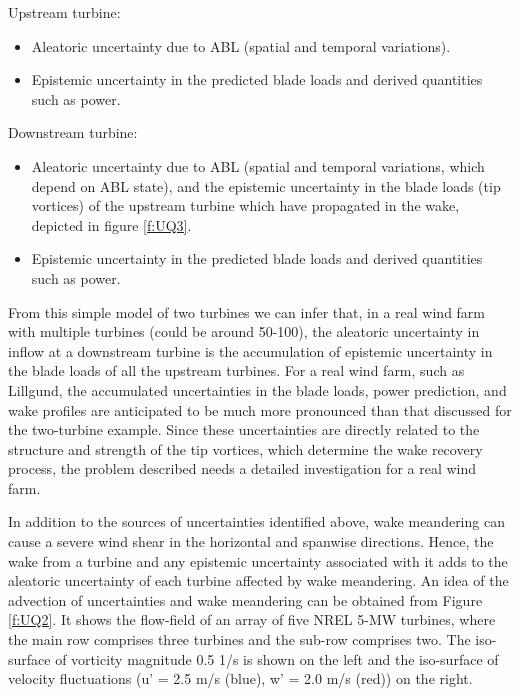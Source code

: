 \documentclass[]{aiaa-tc}%
\begin{document}
Upstream turbine: 
\begin{itemize}
  \item Aleatoric uncertainty due to ABL (spatial and temporal variations).
  \item Epistemic uncertainty in the predicted blade loads and derived quantities such as power.
\end{itemize}

Downstream turbine: 
\begin{itemize}
  \item Aleatoric uncertainty due to ABL (spatial and temporal variations, which depend on ABL state), and the epistemic uncertainty in the blade loads (tip vortices) of the upstream turbine which have propagated in the wake, depicted in figure \ref{f:UQ3}.
  \item Epistemic uncertainty in the predicted blade loads and derived quantities such as power.
\end{itemize}

From this simple model of two turbines we can infer that, in a real wind farm with multiple turbines (could be around 50-100), the aleatoric uncertainty in inflow at a downstream turbine is the accumulation of epistemic uncertainty in the blade loads of all the upstream turbines. For a real wind farm, such as Lillgund,\cite{churchfield:aiaa2012} the accumulated uncertainties in the blade loads, power prediction, and wake profiles are anticipated to be much more pronounced than that discussed for the two-turbine example. Since these uncertainties are directly related to the structure and strength of the tip vortices, which determine the wake recovery process, the problem described needs a detailed investigation for a real wind farm.

In addition to the sources of uncertainties identified above, wake meandering can cause a severe wind shear in the horizontal and spanwise directions. Hence, the wake from a turbine and any epistemic uncertainty associated with it adds to the aleatoric uncertainty of each turbine affected by wake meandering. An idea of the advection of uncertainties and wake meandering can be obtained from Figure \ref{f:UQ2}. It shows the flow-field of an array of five NREL 5-MW turbines, where the main row comprises three turbines and the sub-row comprises two. The iso-surface of vorticity magnitude 0.5 1/s is shown on the left and the iso-surface of velocity fluctuations (u’ = 2.5 m/s (blue), w’ = 2.0 m/s (red)) on the right. 
\end{document}
